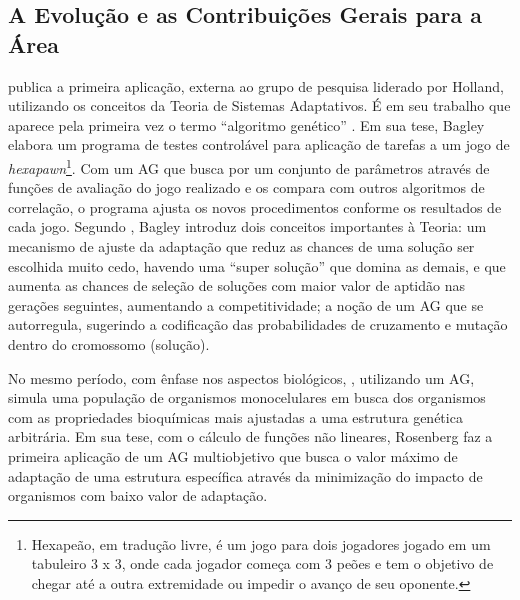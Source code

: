 \subsection{A Evolução e as Contribuições Gerais para a Área}
\label{subsec:EvolucaoCampoPesquisaAlgoritmosGeneticos}

\citet{bagley_1967} publica a primeira aplicação, externa ao grupo de pesquisa liderado por Holland, utilizando os conceitos da Teoria de Sistemas Adaptativos. É em seu trabalho que aparece pela primeira vez o termo \enquote{algoritmo genético} \cite[pg.133]{bagley_1967}. Em sua tese, Bagley elabora um programa de testes controlável para aplicação de tarefas a um jogo de \textit{hexapawn}\footnote{Hexapeão, em tradução livre, é um jogo para dois jogadores jogado em um tabuleiro 3 x 3, onde cada jogador começa com 3 peões e tem o objetivo de chegar até a outra extremidade ou impedir o avanço de seu oponente.}. Com um AG que busca por um conjunto de parâmetros através de funções de avaliação do jogo realizado e os compara com outros algoritmos de correlação, o programa ajusta os novos procedimentos conforme os resultados de cada jogo. Segundo , Bagley introduz dois conceitos importantes à Teoria: um mecanismo de ajuste da adaptação que reduz as chances de uma solução ser escolhida muito cedo, havendo uma \enquote{super solução} que domina as demais, e que aumenta as chances de seleção de soluções com maior valor de aptidão nas gerações seguintes, aumentando a competitividade; a noção de um AG que se autorregula, sugerindo a codificação das probabilidades de cruzamento e mutação dentro do cromossomo (solução).

No mesmo período, com ênfase nos aspectos biológicos, , utilizando um AG, simula uma população de organismos monocelulares em busca dos organismos com as propriedades bioquímicas mais ajustadas a uma estrutura genética arbitrária. Em sua tese, com o cálculo de funções não lineares, Rosenberg faz a primeira aplicação de um AG multiobjetivo que busca o valor máximo de adaptação de uma estrutura específica através da minimização do impacto de organismos com baixo valor de adaptação. 

